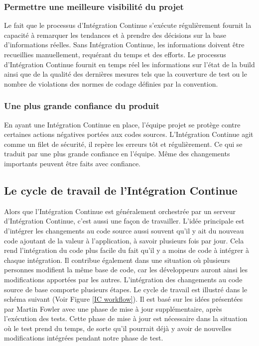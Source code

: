       \subsubsection{Permettre une meilleure visibilité du projet}
      Le fait que le processus d’Intégration Continue s’exécute régulièrement fournit la capacité à remarquer les tendances et à prendre des décisions sur la base d’informations réelles. Sans Intégration Continue, les informations doivent être recueillies manuellement, requérant du temps et des efforts. Le processus d’Intégration Continue fournit en temps réel les informations sur l'état de la build ainsi que de la qualité des dernières mesures tels que la couverture de test ou le nombre de violations des normes de codage définies par la convention.

      \subsubsection{Une plus grande confiance du produit}
      En ayant une Intégration Continue en place, l'équipe projet se protège contre certaines actions négatives portées aux codes sources. L’Intégration Continue agit comme un filet de sécurité, il repère les erreurs tôt et régulièrement. Ce qui se traduit par une plus grande confiance en l'équipe. Même des changements importants peuvent être faits avec confiance.

    \subsection{Le cycle de travail de l’Intégration Continue}
    Alors que l’Intégration Continue est généralement orchestrée par un serveur d’Intégration Continue, c’est aussi une façon de travailler. L'idée principale est d'intégrer les changements au code source aussi souvent qu’il y ait du nouveau code ajoutant de la valeur à l’application, à savoir plusieurs fois par jour. Cela rend l'intégration du code plus facile du fait qu'il y a moins de code à intégrer à chaque intégration. Il contribue également dans une situation où plusieurs personnes modifient la même base de code, car les développeurs auront ainsi les modifications apportées par les autres.
    L'intégration des changements au code source de base comporte plusieurs étapes. Le cycle de travail est illustré dans le schéma suivant (Voir Figure \ref{IC workflow}). Il est basé sur les idées présentées par Martin Fowler \cite{Fow00} avec une phase de mise à jour supplémentaire, après l'exécution des tests. Cette phase de mise à jour est nécessaire dans la situation où le test prend du temps, de sorte qu'il pourrait déjà y avoir de nouvelles modifications intégrées pendant notre phase de test.\\

